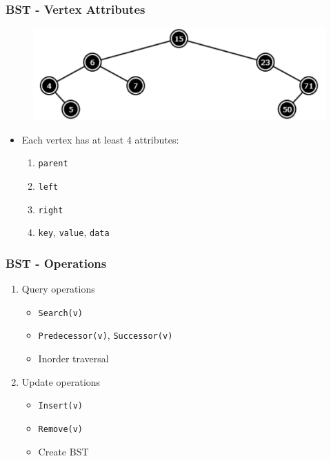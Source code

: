 \documentclass{beamer}
\begin{document}
\begin{frame}[fragile]
\frametitle{BST - Vertex Attributes}
	\begin{figure}
		\centering
		\includegraphics[scale=0.4]{imgs/2.3/bst/bst.png}
	\end{figure}
	\begin{itemize}
		\item Each vertex has at least 4 attributes:
			\begin{enumerate}
				\item \verb|parent|
				\item \verb|left|
				\item \verb|right|
				\item \verb|key|, \verb|value|, \verb|data|
			\end{enumerate}
	\end{itemize}
\end{frame}

\begin{frame}[fragile]
\frametitle{BST - Operations}
	\begin{enumerate}
		\item Query operations
			\begin{itemize}
				\item \verb|Search(v)|
				\item \verb|Predecessor(v)|, \verb|Successor(v)|
				\item Inorder traversal
			\end{itemize}
		\item Update operations
			\begin{itemize}
				\item \verb|Insert(v)|
				\item \verb|Remove(v)|
				\item Create BST
			\end{itemize}
	\end{enumerate}
\end{frame}
\end{document}
